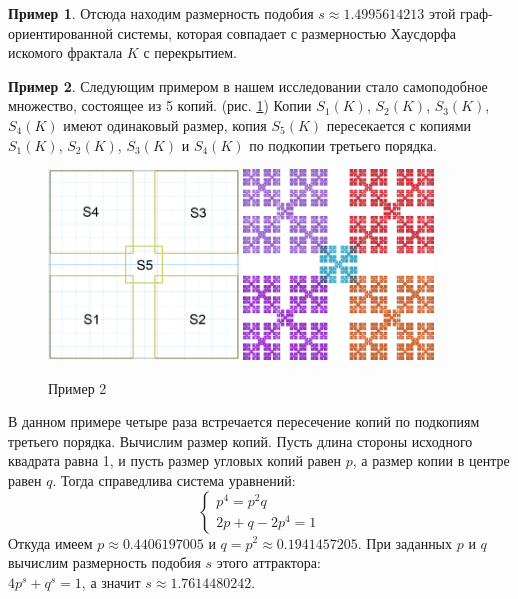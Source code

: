 \documentclass[a4paper,14pt]{extarticle} %
\newcommand{\0}{\varnothing}
\newcommand{\8}{\infty}
\theoremstyle{definition}
\newtheorem{example}{Пример}
\begin{document}
\begin{example}
Отсюда находим размерность подобия $s\approx1.4995614213$ этой граф-ориентированной системы, которая совпадает с размерностью Хаусдорфа искомого фрактала $K$ с перекрытием. 
\end{example}


\begin{example}\label{ex:2}
Следующим примером в нашем исследовании стало самоподобное множество, состоящее из 5 копий. (рис. \ref{fig:primer2_skelet}) 
Копии $S_1(K)$, $S_2(K)$, $S_3(K)$, $S_4(K)$ имеют одинаковый размер, копия $S_5(K)$ пересекается с копиями $S_1(K)$, $S_2(K)$, $S_3(K)$ и $S_4(K)$ по подкопии третьего порядка. 

\begin{figure}[H]
    \centering
    \includegraphics[width=0.45\textwidth]{1_1_скелет.png}
    \hfill
    \includegraphics[width=0.45\textwidth]{1_1.png}
    \caption{Пример 2}
    \label{fig:primer2_skelet}
\end{figure}
В данном примере четыре раза встречается пересечение копий по подкопиям третьего порядка. 
Вычислим размер копий. Пусть длина стороны исходного квадрата равна 1, и пусть размер угловых копий  равен $p$, а размер копии в центре равен $q$.
Тогда справедлива система уравнений:
$$
\begin{cases}
p^4 = p^2q\\
2p + q - 2p^4 = 1
\end{cases}
$$
Откуда имеем $p\approx0.4406197005$ и $q=p^2\approx0.1941457205$.
При заданных $p$ и $q$ вычислим размерность подобия $s$ этого аттрактора:\\
$4p^s+q^s=1$, а значит $s\approx1.7614480242$.
 

\end{example}
\end{document}
